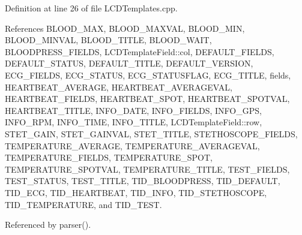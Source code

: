 Definition at line 26 of file L\-C\-D\-Templates.\-cpp.



References B\-L\-O\-O\-D\-\_\-\-M\-A\-X, B\-L\-O\-O\-D\-\_\-\-M\-A\-X\-V\-A\-L, B\-L\-O\-O\-D\-\_\-\-M\-I\-N, B\-L\-O\-O\-D\-\_\-\-M\-I\-N\-V\-A\-L, B\-L\-O\-O\-D\-\_\-\-T\-I\-T\-L\-E, B\-L\-O\-O\-D\-\_\-\-W\-A\-I\-T, B\-L\-O\-O\-D\-P\-R\-E\-S\-S\-\_\-\-F\-I\-E\-L\-D\-S, L\-C\-D\-Template\-Field\-::col, D\-E\-F\-A\-U\-L\-T\-\_\-\-F\-I\-E\-L\-D\-S, D\-E\-F\-A\-U\-L\-T\-\_\-\-S\-T\-A\-T\-U\-S, D\-E\-F\-A\-U\-L\-T\-\_\-\-T\-I\-T\-L\-E, D\-E\-F\-A\-U\-L\-T\-\_\-\-V\-E\-R\-S\-I\-O\-N, E\-C\-G\-\_\-\-F\-I\-E\-L\-D\-S, E\-C\-G\-\_\-\-S\-T\-A\-T\-U\-S, E\-C\-G\-\_\-\-S\-T\-A\-T\-U\-S\-F\-L\-A\-G, E\-C\-G\-\_\-\-T\-I\-T\-L\-E, fields, H\-E\-A\-R\-T\-B\-E\-A\-T\-\_\-\-A\-V\-E\-R\-A\-G\-E, H\-E\-A\-R\-T\-B\-E\-A\-T\-\_\-\-A\-V\-E\-R\-A\-G\-E\-V\-A\-L, H\-E\-A\-R\-T\-B\-E\-A\-T\-\_\-\-F\-I\-E\-L\-D\-S, H\-E\-A\-R\-T\-B\-E\-A\-T\-\_\-\-S\-P\-O\-T, H\-E\-A\-R\-T\-B\-E\-A\-T\-\_\-\-S\-P\-O\-T\-V\-A\-L, H\-E\-A\-R\-T\-B\-E\-A\-T\-\_\-\-T\-I\-T\-L\-E, I\-N\-F\-O\-\_\-\-D\-A\-T\-E, I\-N\-F\-O\-\_\-\-F\-I\-E\-L\-D\-S, I\-N\-F\-O\-\_\-\-G\-P\-S, I\-N\-F\-O\-\_\-\-R\-P\-M, I\-N\-F\-O\-\_\-\-T\-I\-M\-E, I\-N\-F\-O\-\_\-\-T\-I\-T\-L\-E, L\-C\-D\-Template\-Field\-::row, S\-T\-E\-T\-\_\-\-G\-A\-I\-N, S\-T\-E\-T\-\_\-\-G\-A\-I\-N\-V\-A\-L, S\-T\-E\-T\-\_\-\-T\-I\-T\-L\-E, S\-T\-E\-T\-H\-O\-S\-C\-O\-P\-E\-\_\-\-F\-I\-E\-L\-D\-S, T\-E\-M\-P\-E\-R\-A\-T\-U\-R\-E\-\_\-\-A\-V\-E\-R\-A\-G\-E, T\-E\-M\-P\-E\-R\-A\-T\-U\-R\-E\-\_\-\-A\-V\-E\-R\-A\-G\-E\-V\-A\-L, T\-E\-M\-P\-E\-R\-A\-T\-U\-R\-E\-\_\-\-F\-I\-E\-L\-D\-S, T\-E\-M\-P\-E\-R\-A\-T\-U\-R\-E\-\_\-\-S\-P\-O\-T, T\-E\-M\-P\-E\-R\-A\-T\-U\-R\-E\-\_\-\-S\-P\-O\-T\-V\-A\-L, T\-E\-M\-P\-E\-R\-A\-T\-U\-R\-E\-\_\-\-T\-I\-T\-L\-E, T\-E\-S\-T\-\_\-\-F\-I\-E\-L\-D\-S, T\-E\-S\-T\-\_\-\-S\-T\-A\-T\-U\-S, T\-E\-S\-T\-\_\-\-T\-I\-T\-L\-E, T\-I\-D\-\_\-\-B\-L\-O\-O\-D\-P\-R\-E\-S\-S, T\-I\-D\-\_\-\-D\-E\-F\-A\-U\-L\-T, T\-I\-D\-\_\-\-E\-C\-G, T\-I\-D\-\_\-\-H\-E\-A\-R\-T\-B\-E\-A\-T, T\-I\-D\-\_\-\-I\-N\-F\-O, T\-I\-D\-\_\-\-S\-T\-E\-T\-H\-O\-S\-C\-O\-P\-E, T\-I\-D\-\_\-\-T\-E\-M\-P\-E\-R\-A\-T\-U\-R\-E, and T\-I\-D\-\_\-\-T\-E\-S\-T.



Referenced by parser().


